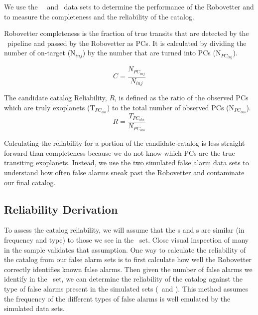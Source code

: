 %

\newcommand{\opsfp}{N$_{FP_{obs}}$}
\newcommand{\opspc}{N$_{PC_{obs}}$}
\newcommand{\opsN}{N$_{obs}$}
\newcommand{\trueopspc}{T$_{PC_{obs}}$}
\newcommand{\missedfp}{T$_{FP_{obs}}$ - N$_{FP_{obs}}$}
\newcommand{\invfp}{N$_{FP_{inv}}$}
\newcommand{\invpc}{N$_{PC_{inv}}$}
\newcommand{\invN}{N$_{inv}$}
\newcommand{\sfatce}{SFA-TCE}


We use the \injtce\, \scrtce\ and \invtce\ data sets to determine the performance of the Robovetter and to measure the completeness and the reliability of the catalog. 

Robovetter completeness is the fraction of true transits that are detected by the \Kepler\ pipeline and passed by the Robovetter as PCs.  It is calculated by dividing the number of on-target  (N$_{inj}$) by the number that are turned into PCs (N$_{PC_{inj}}$). 

\begin{equation}
\label{comp}
C = \frac{N_{PC_{inj}}}{N_{inj}}
\end{equation}

The candidate catalog Reliability, $R$, is defined as the ratio of the observed PCs which are truly exoplanets (\trueopspc) to the total number of observed PCs (\opspc). 
\begin{equation}
\label{eq:rel}
R = \frac{T_{PC_{obs}}}{N_{PC_{obs}}}
\end{equation}

Calculating the reliability for a portion of the candidate catalog is less straight forward than completeness because we do not know which PCs are the true transiting exoplanets. Instead, we use the two simulated false alarm data sets to understand how often false alarms sneak past the Robovetter and contaminate our final catalog.


\subsection{Reliability Derivation}
\label{s:relcalc}
To assess the catalog reliability, we will assume that the \scrtce s and \invtce s are similar (in frequency and type) to those we see in the \opstce\ set. Close visual inspection of many in the sample validates that assumption. One way to calculate the reliability of the catalog from our false alarm sets is to first calculate how well the Robovetter correctly identifies known false alarms.  Then given the number of false alarms we identify in the \opstce\ set, we can determine the reliability of the catalog against the type of false alarms present in the simulated sets (\invtce\ and \scrtce). This method assumes the frequency of the different types of false alarms is well emulated by the simulated data sets. 


